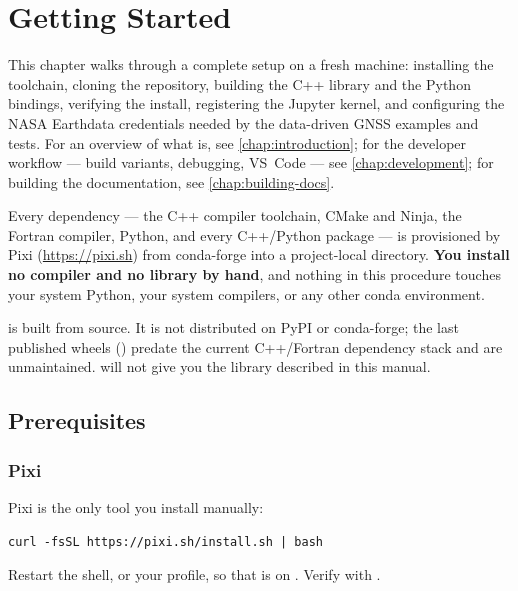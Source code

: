 \chapter{Getting Started}
\label{chap:getting-started}

This chapter walks through a complete \lupnt{} setup on a fresh machine:
installing the toolchain, cloning the repository, building the C++ library and
the Python bindings, verifying the install, registering the Jupyter kernel, and
configuring the NASA Earthdata credentials needed by the data-driven GNSS
examples and tests. For an overview of what \lupnt{} is, see
\cref{chap:introduction}; for the developer workflow --- build variants,
debugging, VS~Code --- see \cref{chap:development}; for building the
documentation, see \cref{chap:building-docs}.

Every dependency --- the C++ compiler toolchain, CMake and Ninja, the Fortran
compiler, Python, and every C++/Python package --- is provisioned by Pixi
(\url{https://pixi.sh}) from conda-forge into a project-local 
directory. \textbf{You install no compiler and no library by hand}, and nothing
in this procedure touches your system Python, your system compilers, or any
other conda environment.

\begin{lupntnote}
\lupnt{} is built from source. It is not distributed on PyPI or conda-forge;
the last published \pylupnt{} wheels () predate the current
C++/Fortran dependency stack and are unmaintained. 
will not give you the library described in this manual.
\end{lupntnote}

\section{Prerequisites}
\label{sec:gs-prereq}

\subsection{Pixi}

Pixi is the only tool you install manually:

\begin{lstlisting}[language=shell]
curl -fsSL https://pixi.sh/install.sh | bash
\end{lstlisting}

Restart the shell, or  your profile, so that  is on
. Verify with .

